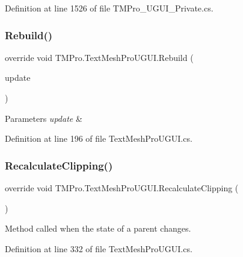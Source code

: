 Definition at line 1526 of file T\+M\+Pro\+\_\+\+U\+G\+U\+I\+\_\+\+Private.\+cs.

\mbox{\label{class_t_m_pro_1_1_text_mesh_pro_u_g_u_i_a963457c98b96eb2387dd43d40a7dcc57}} 
\subsubsection{\texorpdfstring{Rebuild()}{Rebuild()}}
{\footnotesize\ttfamily override void T\+M\+Pro.\+Text\+Mesh\+Pro\+U\+G\+U\+I.\+Rebuild (\begin{DoxyParamCaption}\item[{Canvas\+Update}]{update }\end{DoxyParamCaption})}






\begin{DoxyParams}{Parameters}
{\em update} & \\
\hline
\end{DoxyParams}


Definition at line 196 of file Text\+Mesh\+Pro\+U\+G\+U\+I.\+cs.

\mbox{\label{class_t_m_pro_1_1_text_mesh_pro_u_g_u_i_ada791339448a5b531f1bf276108b2b8c}} 
\subsubsection{\texorpdfstring{RecalculateClipping()}{RecalculateClipping()}}
{\footnotesize\ttfamily override void T\+M\+Pro.\+Text\+Mesh\+Pro\+U\+G\+U\+I.\+Recalculate\+Clipping (\begin{DoxyParamCaption}{ }\end{DoxyParamCaption})}



Method called when the state of a parent changes. 



Definition at line 332 of file Text\+Mesh\+Pro\+U\+G\+U\+I.\+cs.

\mbox{\label{class_t_m_pro_1_1_text_mesh_pro_u_g_u_i_a51306cc8b5f95caf7a7d8b6127c92fe5}} 
